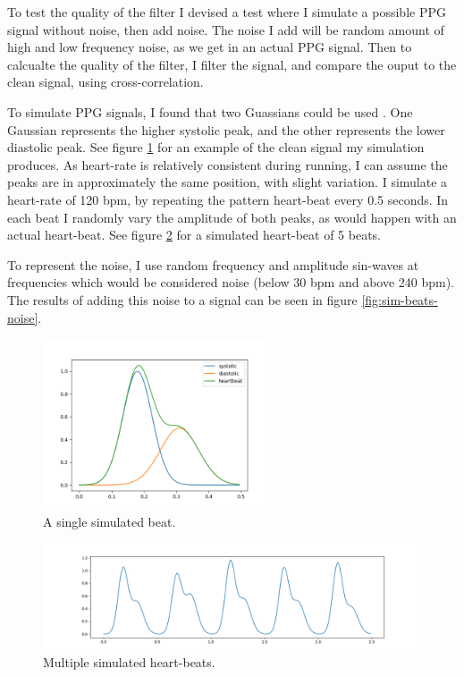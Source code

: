 \documentclass[12pt,a4paper,twoside,openright]{report}
\begin{document}
To test the quality of the filter I devised a test where I simulate a possible
PPG signal without noise, then add noise. The noise I add will be random
amount of high and low frequency noise, as we get in an actual PPG signal.
Then to calcualte the quality of the filter, I filter the signal, and compare
the ouput to the clean signal, using cross-correlation.

To simulate PPG signals, I found that two Guassians could be used
\cite{Banerjee15}. One Gaussian represents the higher systolic peak, and the
other represents the lower diastolic peak. 
See figure \ref{fig:sim-beat} for an example of the clean signal my simulation
produces. As heart-rate is relatively
consistent during running, I can assume the peaks are in approximately the
same position, with slight variation. I simulate a heart-rate of 120 bpm, by
repeating the pattern heart-beat every 0.5 seconds. In each beat I randomly
vary the amplitude of both peaks, as would happen with an actual heart-beat.
See figure \ref{fig:sim-beats} for a simulated heart-beat of 5 beats.

To represent the noise, I use random frequency and amplitude sin-waves at
frequencies which would be considered noise (below 30 bpm and above 240 bpm).
The results of adding this noise to a signal can be seen in figure
\ref{fig:sim-beats-noise}.

\begin{figure}[tbh]
	\centerline{\includegraphics[width=0.6\textwidth]{figs/sim-beat.png}}
	\caption{A single simulated beat.}
	\label{fig:sim-beat}
\end{figure}

\begin{figure}[tbh]
	\centerline{\includegraphics[width=1\textwidth]{figs/sim-beats.png}}
	\caption{Multiple simulated heart-beats.}
	\label{fig:sim-beats}
\end{figure}
\end{document}
